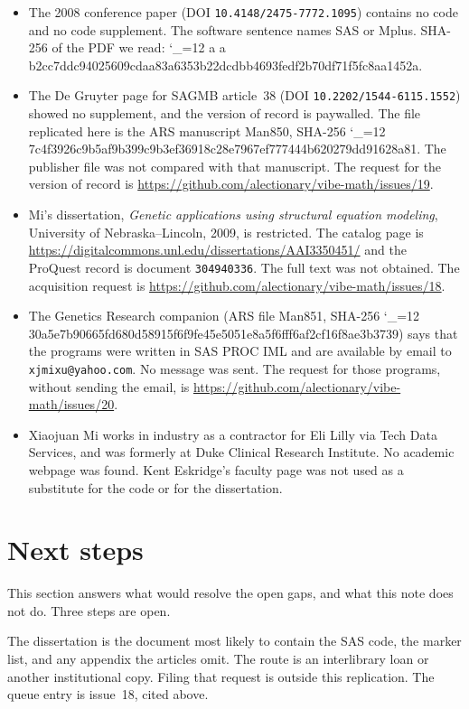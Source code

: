 \documentclass[11pt]{article}
\makeatletter
\newcommand{\sha}{\begingroup\catcode`\_=12 \sha@read}
\newcommand{\sha@read}[1]{\ttfamily\sha@loop#1\relax\endgroup}
\def\sha@loop#1{%
  \ifx\relax#1\else
    #1\allowbreak
    \expandafter\sha@loop
  \fi}
\makeatother
\begin{document}
\begin{itemize}
\item The 2008 conference paper (DOI \texttt{10.4148/2475-7772.1095})
contains no code and no code supplement. The software sentence names SAS or
Mplus. SHA-256 of the PDF we read:
\sha{ab2cc7ddc94025609cdaa83a6353b22dcdbb4693fedf2b70df71f5fc8aa1452a}.
\item The De Gruyter page for SAGMB article~38
(DOI \texttt{10.2202/1544-6115.1552}) showed no supplement, and the version
of record is paywalled. The file replicated here is the ARS manuscript
Man850, SHA-256
\sha{27c4f3926c9b5af9b399c9b3ef36918c28e7967ef777444b620279dd91628a81}.
The publisher file was not compared with that manuscript. The request for
the version of record is
\url{https://github.com/alectionary/vibe-math/issues/19}.
\item Mi's dissertation, \emph{Genetic applications using structural
equation modeling}, University of Nebraska--Lincoln, 2009, is restricted.
The catalog page is
\url{https://digitalcommons.unl.edu/dissertations/AAI3350451/}
and the ProQuest record is document \texttt{304940336}. The full text was
not obtained. The acquisition request is
\url{https://github.com/alectionary/vibe-math/issues/18}.
\item The Genetics Research companion (ARS file Man851, SHA-256
\sha{630a5e7b90665fd680d58915f6f9fe45e5051e8a5f6fff6af2cf16f8ae3b3739})
says that the programs were written in SAS PROC IML and are available by
email to \texttt{xjmixu@yahoo.com}. No message was sent. The request for
those programs, without sending the email, is
\url{https://github.com/alectionary/vibe-math/issues/20}.
\item Xiaojuan Mi works in industry as a contractor for Eli Lilly via
Tech Data Services, and was formerly at Duke Clinical Research Institute.
No academic webpage was found. Kent Eskridge's faculty page was not used as
a substitute for the code or for the dissertation.
\end{itemize}

\section{Next steps}
\label{sec:next}

This section answers what would resolve the open gaps, and what this note
does not do. Three steps are open.

The dissertation is the document most likely to contain the SAS code, the
marker list, and any appendix the articles omit. The route is an interlibrary
loan or another institutional copy. Filing that request is outside this
replication. The queue entry is issue~18, cited above.
\end{document}
